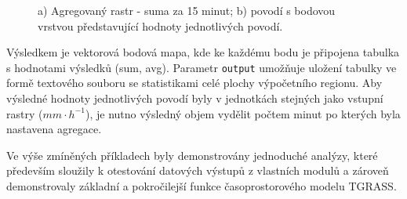 \documentclass[a4paper,12pt,oneside]{report}
\begin{document}
\begin{figure}[h!]%
    \centering
    \qquad

    \caption[GUI modul]{ a) Agregovaný rastr - suma za 15 minut; b) povodí s bodovou vrstvou představující hodnoty jednotlivých povodí.  \centering  }
\end{figure}

Výsledkem je vektorová bodová mapa, kde ke každému bodu je připojena
tabulka s hodnotami výsledků (sum, avg). Parametr \texttt{output}
umožňuje uložení tabulky ve formě textového souboru se statistikami
celé plochy výpočetního regionu.  Aby výsledné hodnoty jednotlivých 
povodí byly v jednotkách stejných jako vstupní rastry ($mm \cdot h^{-1}$), 
je nutno výsledný objem vydělit počtem minut po kterých byla nastavena agregace.

Ve výše zmíněných příkladech byly demonstrovány jednoduché analýzy, které
 především sloužily k otestování datových výstupů z vlastních modulů a 
 zároveň demonstrovaly základní a pokročilejší funkce časoprostorového modelu TGRASS. 


\setcounter{footnote}{1}
\end{document}
